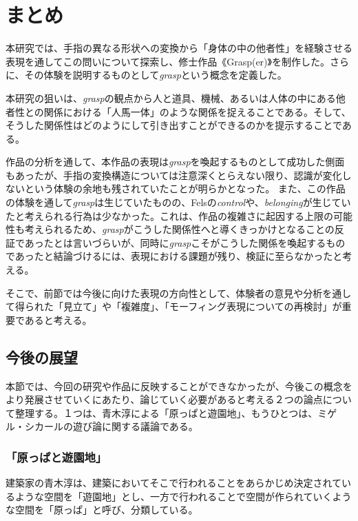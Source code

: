 \chapter{まとめ}
\label{matome}
本研究では、手指の異なる形状への変換から「身体の中の他者性」を経験させる表現を通してこの問いについて探索し、修士作品《Grasp(er)》を制作した。さらに、その体験を説明するものとして\textit{grasp}という概念を定義した。

本研究の狙いは、\textit{grasp}の観点から人と道具、機械、あるいは人体の中にある他者性との関係における「人馬一体」のような関係を捉えることである。そして、そうした関係性はどのようにして引き出すことができるのかを提示することである。

作品の分析を通して、本作品の表現は\textit{grasp}を喚起するものとして成功した側面もあったが、手指の変換構造については注意深くとらえない限り、認識が変化しないという体験の余地も残されていたことが明らかとなった。
また、この作品の体験を通して\textit{grasp}は生じていたものの、Felsの\textit{control}や、\textit{belonging}が生じていたと考えられる行為は少なかった。これは、作品の複雑さに起因する上限の可能性も考えられるため、\textit{grasp}がこうした関係性へと導くきっかけとなることの反証であったとは言いづらいが、同時に\textit{grasp}こそがこうした関係を喚起するものであったと結論づけるには、表現における課題が残り、検証に至らなかったと考える。

そこで、前節では今後に向けた表現の方向性として、体験者の意見や分析を通して得られた「見立て」や「複雑度」、「モーフィング表現についての再検討」が重要であると考える。

\section{今後の展望}
本節では、今回の研究や作品に反映することができなかったが、今後この概念をより発展させていくにあたり、論じていく必要があると考える２つの論点について整理する。１つは、青木淳による「原っぱと遊園地」、もうひとつは、ミゲル・シカールの遊び論に関する議論である。

\subsection{「原っぱと遊園地」}
建築家の青木淳は、建築においてそこで行われることをあらかじめ決定されているような空間を「遊園地」とし、一方で行われることで空間が作られていくような空間を「原っぱ」と呼び、分類している。

